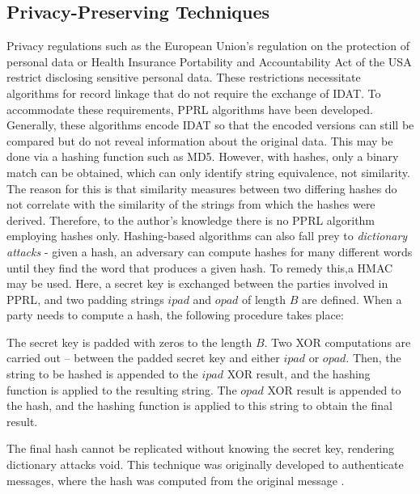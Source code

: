 \subsection{Privacy-Preserving Techniques}
Privacy regulations such as the European Union's regulation on the protection of personal data %
 or Health Insurance Portability and Accountability Act of the USA restrict disclosing sensitive personal data. %
These restrictions necessitate algorithms for record linkage that do not require the exchange of \ac{IDAT}.
To accommodate these requirements, \ac{PPRL} algorithms have been developed.
Generally, these algorithms encode \ac{IDAT} so that the encoded versions can still be compared but do not reveal information about the original data.
This may be done via a hashing function such as MD5. %
However, with hashes, only a binary match can be obtained, which can only identify string equivalence, not similarity.
The reason for this is that similarity measures between two differing hashes do not correlate with the similarity of the strings from which the hashes were derived.
Therefore, to the author's knowledge there is no \ac{PPRL} algorithm employing hashes only.
Hashing-based algorithms can also fall prey to \textit{dictionary attacks} - given a hash, an adversary can compute hashes for many different words until they find the word that produces a given hash.
To remedy this,a \ac{HMAC} may be used.
Here, a secret key is exchanged between the parties involved in \ac{PPRL}, and two padding strings $ipad$ and $opad$ of length $B$ are defined.
When a party needs to compute a hash, the following procedure takes place:

The secret key is padded with zeros to the length $B$.
Two \ac{XOR} computations are carried out -- between the padded secret key and either $ipad$ or $opad$.
Then, the string to be hashed is appended to the $ipad$ \ac{XOR} result, and the hashing function is applied to the resulting string.
The $opad$ \ac{XOR} result is appended to the hash, and the hashing function is applied to this string to obtain the final result.

The final hash cannot be replicated without knowing the secret key, rendering dictionary attacks void.
This technique was originally developed to authenticate messages, where the hash was computed from the original message
\cite{krawczykHMACKeyedHashingMessage1997}.

